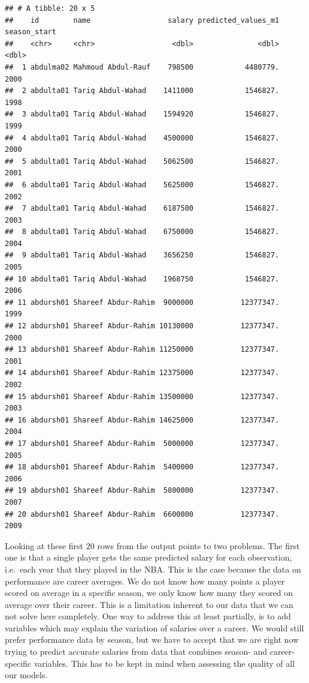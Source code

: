 \documentclass[
]{book}
\begin{document}
\begin{verbatim}
## # A tibble: 20 x 5
##    id        name                  salary predicted_values_m1 season_start
##    <chr>     <chr>                  <dbl>               <dbl>        <dbl>
##  1 abdulma02 Mahmoud Abdul-Rauf    798500            4480779.         2000
##  2 abdulta01 Tariq Abdul-Wahad    1411000            1546827.         1998
##  3 abdulta01 Tariq Abdul-Wahad    1594920            1546827.         1999
##  4 abdulta01 Tariq Abdul-Wahad    4500000            1546827.         2000
##  5 abdulta01 Tariq Abdul-Wahad    5062500            1546827.         2001
##  6 abdulta01 Tariq Abdul-Wahad    5625000            1546827.         2002
##  7 abdulta01 Tariq Abdul-Wahad    6187500            1546827.         2003
##  8 abdulta01 Tariq Abdul-Wahad    6750000            1546827.         2004
##  9 abdulta01 Tariq Abdul-Wahad    3656250            1546827.         2005
## 10 abdulta01 Tariq Abdul-Wahad    1968750            1546827.         2006
## 11 abdursh01 Shareef Abdur-Rahim  9000000           12377347.         1999
## 12 abdursh01 Shareef Abdur-Rahim 10130000           12377347.         2000
## 13 abdursh01 Shareef Abdur-Rahim 11250000           12377347.         2001
## 14 abdursh01 Shareef Abdur-Rahim 12375000           12377347.         2002
## 15 abdursh01 Shareef Abdur-Rahim 13500000           12377347.         2003
## 16 abdursh01 Shareef Abdur-Rahim 14625000           12377347.         2004
## 17 abdursh01 Shareef Abdur-Rahim  5000000           12377347.         2005
## 18 abdursh01 Shareef Abdur-Rahim  5400000           12377347.         2006
## 19 abdursh01 Shareef Abdur-Rahim  5800000           12377347.         2007
## 20 abdursh01 Shareef Abdur-Rahim  6600000           12377347.         2009
\end{verbatim}

Looking at these first \(20\) rows from the output points to two problems.
The first one is that a single player gets the same predicted salary for each
observation, i.e.~each year that they played in the NBA. This is the case because
the data on performance are career averages. We do not know how many points a
player scored on average in a specific season, we only know how many they scored
on average over their career. This is a limitation inherent to our data that we
can not solve here completely. One way to address this at least partially, is to
add variables which may explain the variation of salaries over a career. We
would still prefer performance data by season, but we have to accept that we are
right now trying to predict accurate salaries from data that combines season-
and career-specific variables. This has to be kept in mind when assessing the
quality of all our models.
\end{document}
